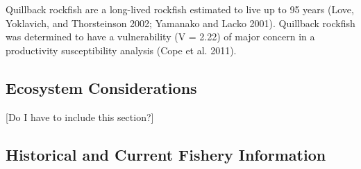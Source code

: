 \documentclass[11pt,
  english,
  a4paper,
]{article}
\begin{document}
\leavevmode\tagmcend\tagstructend\par


Quillback rockfish are a long-lived rockfish estimated to live up to 95 years {(Love, Yoklavich, and Thorsteinson 2002; Yamanako and Lacko 2001)\leavevmode\tagmcend\tagstructend}. Quillback rockfish was determined to have a vulnerability (V = 2.22) of major concern in a productivity susceptibility analysis {(Cope et al. 2011)\leavevmode\tagmcend\tagstructend}.

\leavevmode\tagmcend\tagstructend\par


\hypertarget{ecosystem-considerations}{%
\subsection{Ecosystem Considerations}\label{ecosystem-considerations}}

\leavevmode\tagmcend\tagstructend


{[}Do I have to include this section?{]}

\leavevmode\tagmcend\tagstructend\par


\hypertarget{historical-and-current-fishery-information}{%
\subsection{Historical and Current Fishery Information}\label{historical-and-current-fishery-information}}

\leavevmode\tagmcend\tagstructend

\end{document}
